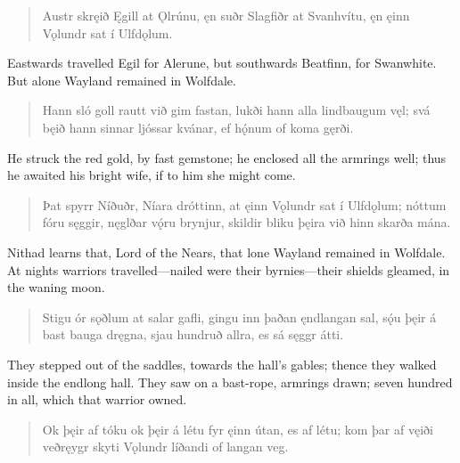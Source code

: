 \begin{verse}
\bva Austr skręið Ęgill \hld at Ǫlrúnu,
ęn suðr Slagfiðr \hld at Svanhvítu,
ęn ęinn Vǫlundr \hld sat í Ulfdǫlum. \\%
\end{verse}

\bvb Eastwards travelled Egil for Alerune, but southwards Beatfinn, for Swanwhite. But alone Wayland remained in Wolfdale. \\

\begin{verse}
\bva Hann sló goll rautt \hld við gim fastan,
lukði hann alla \hld lindbaugum vęl;
svá bęið hann \hld sinnar ljóssar
kvánar, ef hǫ́num \hld of koma gęrði. \\%
\end{verse}

\bvb He struck the red gold, by fast gemstone; he enclosed all the armrings well; thus he awaited his bright wife, if to him she might come. \\

\begin{verse}
\bva Þat spyrr Níðuðr, \hld Níara dróttinn,
at ęinn Vǫlundr \hld sat í Ulfdǫlum;
nóttum fóru sęggir, \hld nęglðar vǫ́ru brynjur,
skildir bliku þęira \hld við hinn skarða mána. \\%
\end{verse}

\bvb Nithad learns that, Lord of the Nears, that lone Wayland remained in Wolfdale. At nights warriors travelled—nailed were their byrnies—their shields gleamed, in the waning moon. \\

\begin{verse}
\bva Stigu ór sǫðlum \hld at salar gafli,
gingu inn þaðan \hld ęndlangan sal,
sǫ́u þęir á bast \hld bauga dręgna,
sjau hundruð allra, \hld es sá sęggr átti. \\%
\end{verse}

\bvb They stepped out of the saddles, towards the hall's gables; thence they walked inside the endlong hall. They saw on a bast-rope, armrings drawn; seven hundred in all, which that warrior owned. \\

\begin{verse}
\bva Ok þęir af tóku \hld ok þęir á létu
fyr ęinn útan, \hld es af létu;
kom þar af vęiði \hld veðręygr skyti
Vǫlundr líðandi \hld of langan veg. \\%
\end{verse}

